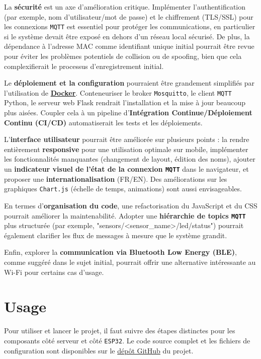 \documentclass[12pt]{article}
\begin{document}
La \textbf{sécurité} est un axe d'amélioration critique. Implémenter l'authentification (par exemple, nom d'utilisateur/mot de passe) et le chiffrement (TLS/SSL) pour les connexions \texttt{MQTT} est essentiel pour protéger les communications, en particulier si le système devait être exposé en dehors d'un réseau local sécurisé. De plus, la dépendance à l'adresse MAC comme identifiant unique initial pourrait être revue pour éviter les problèmes potentiels de collision ou de spoofing, bien que cela complexifierait le processus d'enregistrement initial.

Le \textbf{déploiement et la configuration} pourraient être grandement simplifiés par l'utilisation de \textbf{\href{https://www.docker.com/}{Docker}}. Conteneuriser le broker \texttt{Mosquitto}, le client \texttt{MQTT} Python, le serveur web Flask rendrait l'installation et la mise à jour beaucoup plus aisées. Coupler cela à un pipeline d'\textbf{Intégration Continue/Déploiement Continu (CI/CD)} automatiserait les tests et les déploiements.

L'\textbf{interface utilisateur} pourrait être améliorée sur plusieurs points : la rendre entièrement \textbf{responsive} pour une utilisation optimale sur mobile, implémenter les fonctionnalités manquantes (changement de layout, édition des noms), ajouter un \textbf{indicateur visuel de l'état de la connexion \texttt{MQTT}} dans le navigateur, et proposer une \textbf{internationalisation} (FR/EN). Des améliorations sur les graphiques \texttt{Chart.js} (échelle de temps, animations) sont aussi envisageables.

En termes d'\textbf{organisation du code}, une refactorisation du JavaScript et du CSS pourrait améliorer la maintenabilité. Adopter une \textbf{hiérarchie de topics \texttt{MQTT}} plus structurée (par exemple, "sensors/<sensor\_name>/led/status") pourrait également clarifier les flux de messages à mesure que le système grandit.

Enfin, explorer la \textbf{communication via Bluetooth Low Energy (BLE)}, comme suggéré dans le sujet initial, pourrait offrir une alternative intéressante au Wi-Fi pour certains cas d'usage.

\section{Usage}

Pour utiliser et lancer le projet, il faut suivre des étapes distinctes pour les composants côté serveur et côté \texttt{ESP32}. Le code source complet et les fichiers de configuration sont disponibles sur le \href{https://github.com/GreengagePlum/Project-IOT}{dépôt GitHub} du projet.
\end{document}
